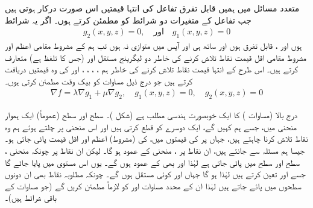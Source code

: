 متعدد مسائل میں ہمیں قابل تفرق تفاعل   کی انتہا  قیمتیں  اس صورت درکار ہوتی ہیں جب  تفاعل کے متغیرات دو شرائط کو مطمئن کرتے ہوں۔ اگر یہ شرائط
\begin{align*}
g_2(x,y,z)=0,\quad \text{اور}\quad g_1(x,y,z)=0
\end{align*}
ہوں اور ،  قابل تفرق ہوں اور ساتھ ہی  اور   آپس میں متوازی نہ ہوں تب ہم  کے مشروط مقامی اعظم اور مشروط  مقامی اقل قیمت  نقاط تلاش کرنے کی خاطر دو لیگرینج مستقل  اور  (جس کا تلفظ   ہے)  متعارف کرتے ہیں۔ اس طرح  کے  انتہا قیمت نقاط تلاش کرنے کی خاطر ہم  ، ، ، ،  اور  کی وہ قیمتیں دریافت کرتے ہیں جو درج ذیل مساوات کو بیک وقت مطمئن کرتی  ہوں۔
\begin{align}\label{مساوات_کثیرالمتغیر_دو_مستقل_لیگرینج_الف}
\nabla f=\lambda\nabla g_1+\mu\nabla g_2,\quad g_1(x,y,z)=0,\quad g_2(x,y,z)=0
\end{align}

درج بالا (مساوات ) کا  ایک خوبصورت ہندسی  مطلب ہے (شکل )۔  سطح  اور سطح  (عموماً)  ایک ہموار منحنی  میں، جسے ہم  کہیں گے،  ایک دوسرے کو قطع کرتی ہیں اور اس منحنی پر چلتے ہوئے ہم وہ نقاط تلاش کرنا چاہتے ہیں، جہاں  پر  کی قیمتوں میں،     کی (مشروط)  اعظم اور اقل قیمت  پائی جاتی ہو۔ جیسا ہم مسئلہ  سے جانتے ہیں، ان نقاط پر ،  منحنی  کے عمود ہو گا۔ لیکن ان نقاط پر چونکہ  منحنی ، سطح   اور  سطح  میں پائی جاتی ہے لہٰذا      اور  بھی  کے عمود ہوں گے۔ یوں  اس مستوی میں پایا جائے گا جسے  اور  تعین کرتے ہیں لہٰذا  ہو گا جہاں  اور  کوئی مستقل ہوں گے۔ چونکہ  مطلوبہ نقاط بھی ان دونوں سطحوں میں پائے جاتے ہیں لہٰذا  ان کے محدد مساوات  اور  کو لازماً مطمئن کریں گے  (جو مساوات  کے باقی شرائط ہیں)۔

